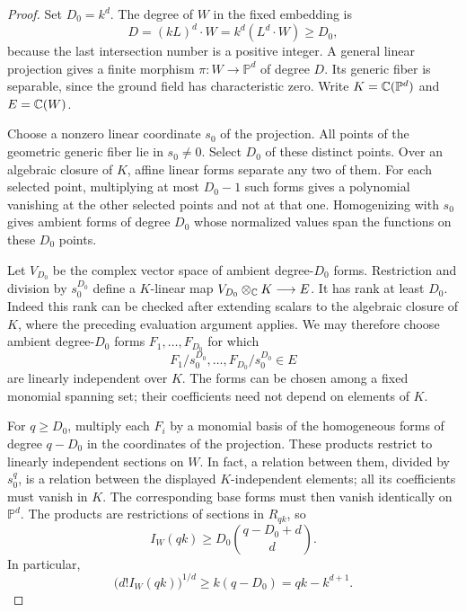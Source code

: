\begin{proof}
Set $D_0=k^d$. The degree of $W$ in the fixed embedding is
\[
 D=(kL)^d\cdot W=k^d(L^d\cdot W)\ge D_0,
\]
because the last intersection number is a positive integer. A general
linear projection gives a finite morphism
$\pi:W\longrightarrow\mathbb P^d$ of degree $D$. Its generic fiber is
separable, since the ground field has characteristic zero. Write
$K=\mathbb C(\mathbb P^d)$ and $E=\mathbb C(W)$.

Choose a nonzero linear coordinate $s_0$ of the projection. All points of
the geometric generic fiber lie in $s_0\ne0$. Select $D_0$ of these
distinct points. Over an algebraic closure of $K$, affine linear forms
separate any two of them. For each selected point, multiplying at most
$D_0-1$ such forms gives a polynomial vanishing at the other selected
points and not at that one. Homogenizing with $s_0$ gives ambient forms
of degree $D_0$ whose normalized values span the functions on these
$D_0$ points.

Let $V_{D_0}$ be the complex vector space of ambient degree-$D_0$
forms. Restriction and division by $s_0^{D_0}$ define a $K$-linear map
$V_{D_0}\otimes_{\mathbb C}K\longrightarrow E$. It has rank at least $D_0$.
Indeed this rank can be checked after extending scalars to the algebraic
closure of $K$, where the preceding evaluation argument applies. We may
therefore choose ambient degree-$D_0$ forms $F_1,\ldots,F_{D_0}$ for which
\[
 F_1/s_0^{D_0},\ldots,F_{D_0}/s_0^{D_0}\in E
\]
are linearly independent over $K$. The forms can be chosen among a fixed
monomial spanning set; their coefficients need not depend on elements
of $K$.

For $q\ge D_0$, multiply each $F_i$ by a monomial basis of the
homogeneous forms of degree $q-D_0$ in the coordinates of the
projection. These products restrict
to linearly independent sections on $W$. In fact, a relation between
them, divided by $s_0^q$, is a relation between the displayed
$K$-independent elements; all its coefficients must vanish in $K$.
The corresponding base forms must then vanish identically on
$\mathbb P^d$. The products are restrictions of sections in $R_{qk}$,
so
\begin{equation}\label{eq:restriction-binomial}
 I_W(qk)\ge D_0\binom{q-D_0+d}{d}.
\end{equation}
In particular,
\begin{equation}\label{eq:restriction-multiples}
 \bigl(d!I_W(qk)\bigr)^{1/d}
 \ge k(q-D_0)=qk-k^{d+1}.
\end{equation}


\end{proof}
